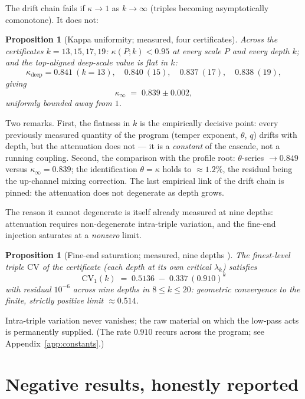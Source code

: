 \documentclass[11pt]{article}
\newtheorem{proposition}[theorem]{Proposition}
\theoremstyle{definition}
\theoremstyle{remark}
\newcommand{\CV}{\mathrm{CV}}
\newcommand{\lam}{\lambda}
\newcommand{\kap}{\kappa}
\begin{document}
The drift chain fails if $\kap \to 1$ as $k \to \infty$ (triples becoming
asymptotically comonotone). It does not:

\begin{proposition}[Kappa uniformity; measured, four certificates]
\label{prop:uniform}
Across the certificates $k = 13, 15, 17, 19$:
$\kap(P; k) < 0.95$ at every scale $P$ and every depth $k$; and the
top-aligned deep-scale value is flat in $k$:
\[
\kap_{\mathrm{deep}} = 0.841\ (k{=}13), \quad 0.840\ (15), \quad
0.837\ (17), \quad 0.838\ (19),
\]
giving
\[
\kap_\infty \;=\; 0.839 \pm 0.002,
\]
uniformly bounded away from $1$.
\end{proposition}

Two remarks. First, the flatness in $k$ is the empirically decisive point:
every previously measured quantity of the program (temper exponent,
$\theta$, $q$) drifts with depth, but the attenuation does not --- it is a
\emph{constant} of the cascade, not a running coupling. Second, the
comparison with the profile root: $\theta$-series $\to 0.849$ versus
$\kap_\infty = 0.839$; the identification $\theta = \kap$ holds to
$\approx 1.2\%$, the residual being the up-channel mixing correction. The
last empirical link of the drift chain is pinned: the attenuation does not
degenerate as depth grows.

The reason it cannot degenerate is itself already measured at nine
depths: attenuation requires non-degenerate intra-triple variation, and
the fine-end injection saturates at a \emph{nonzero} limit.

\begin{proposition}[Fine-end saturation; measured, nine depths
\cite{Temp26}]\label{prop:cv1}
The finest-level triple $\CV$ of the certificate (each depth at its own
critical $\lam_k$) satisfies
\[
\CV_1(k) \;=\; 0.5136 \;-\; 0.337\,(0.910)^k
\]
with residual $10^{-6}$ across nine depths in $8 \leq k \leq 20$:
geometric convergence to the finite, strictly positive limit
$\approx 0.514$.
\end{proposition}

Intra-triple variation never vanishes; the raw material on which the
low-pass acts is permanently supplied. (The rate $0.910$ recurs across the
program; see Appendix~\ref{app:constants}.)

\section{Negative results, honestly reported}
\label{sec:negative}
\end{document}
